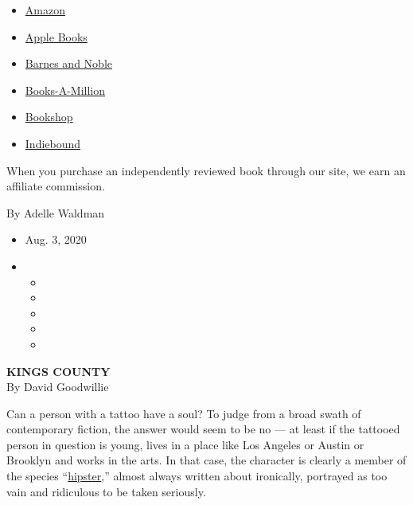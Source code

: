 \begin{itemize}
\tightlist
\item
  \href{https://www.amazon.com/gp/search?index=books\&tag=NYTBSREV-20\&field-keywords=Kings+County+David+Goodwillie}{Amazon}
\item
  \href{https://du-gae-books-dot-nyt-du-prd.appspot.com/buy?title=Kings+County\&author=David+Goodwillie}{Apple
  Books}
\item
  \href{https://www.anrdoezrs.net/click-7990613-11819508?url=https\%3A\%2F\%2Fwww.barnesandnoble.com\%2Fw\%2F\%3Fean\%3D9781501192135}{Barnes
  and Noble}
\item
  \href{https://www.anrdoezrs.net/click-7990613-35140?url=https\%3A\%2F\%2Fwww.booksamillion.com\%2Fp\%2FKings\%2BCounty\%2FDavid\%2BGoodwillie\%2F9781501192135}{Books-A-Million}
\item
  \href{https://bookshop.org/a/3546/9781501192135}{Bookshop}
\item
  \href{https://www.indiebound.org/book/9781501192135?aff=NYT}{Indiebound}
\end{itemize}

When you purchase an independently reviewed book through our site, we
earn an affiliate commission.

By Adelle Waldman

\begin{itemize}
\item
  Aug. 3, 2020
\item
  \begin{itemize}
  \item
  \item
  \item
  \item
  \item
  \end{itemize}
\end{itemize}

\textbf{KINGS COUNTY}\\
By David Goodwillie

Can a person with a tattoo have a soul? To judge from a broad swath of
contemporary fiction, the answer would seem to be no --- at least if the
tattooed person in question is young, lives in a place like Los Angeles
or Austin or Brooklyn and works in the arts. In that case, the character
is clearly a member of the species
``\href{https://www.nytimes3xbfgragh.onion/2010/11/14/books/review/Greif-t.html}{hipster},''
almost always written about ironically, portrayed as too vain and
ridiculous to be taken seriously.

